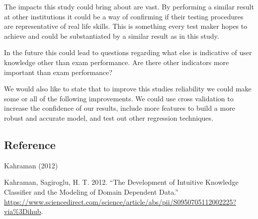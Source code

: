 \documentclass[
  letterpaper,
  DIV=11,
  numbers=noendperiod]{scrartcl}
\newlength{\cslhangindent}
\newenvironment{CSLReferences}[2] %
 {\begin{list}{}{%
  \setlength{\itemindent}{0pt}
  \setlength{\leftmargin}{0pt}
  \setlength{\parsep}{0pt}
  \ifodd #1
   \setlength{\leftmargin}{\cslhangindent}
   \setlength{\itemindent}{-1\cslhangindent}
  \fi
  \setlength{\itemsep}{#2\baselineskip}}}
 {\end{list}}
\begin{document}
The impacts this study could bring about are vast. By performing a
similar result at other institutions it could be a way of confirming if
their testing procedures are representative of real life skills. This is
something every test maker hopes to achieve and could be substantiated
by a similar result as in this study.

In the future this could lead to questions regarding what else is
indicative of user knowledge other than exam performance. Are there
other indicators more important than exam performance?

We would also like to state that to improve this studies reliability we
could make some or all of the following improvements. We could use cross
validation to increase the confidence of our results, include more
features to build a more robust and accurate model, and test out other
regression techniques.

\subsection{\texorpdfstring{\textbf{Reference}}{Reference}}\label{reference}

Kahraman (2012)

\label{refs}
\begin{CSLReferences}{1}{0}
Kahraman, Sagiroglu, H. T. 2012. {``The Development of Intuitive
Knowledge Classifier and the Modeling of Domain Dependent Data.''}
\url{https://www.sciencedirect.com/science/article/abs/pii/S0950705112002225?via\%3Dihub}.

\end{CSLReferences}
\end{document}

